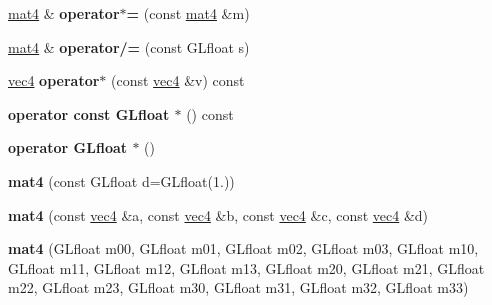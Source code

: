 \begin{DoxyCompactItemize}
\item 
\hypertarget{class_angel_1_1mat4_a9baa0a57a76f9bb9c678bc6dd493e37e}{\hyperlink{class_angel_1_1mat4}{mat4} \& {\bfseries operator$\ast$=} (const \hyperlink{class_angel_1_1mat4}{mat4} \&m)}\label{class_angel_1_1mat4_a9baa0a57a76f9bb9c678bc6dd493e37e}

\item 
\hypertarget{class_angel_1_1mat4_afe41b60ec27afc980d0f37625db898ae}{\hyperlink{class_angel_1_1mat4}{mat4} \& {\bfseries operator/=} (const \-G\-Lfloat s)}\label{class_angel_1_1mat4_afe41b60ec27afc980d0f37625db898ae}

\item 
\hypertarget{class_angel_1_1mat4_a820e0c317d1836cd224ff75f676c6f2f}{\hyperlink{struct_angel_1_1vec4}{vec4} {\bfseries operator$\ast$} (const \hyperlink{struct_angel_1_1vec4}{vec4} \&v) const }\label{class_angel_1_1mat4_a820e0c317d1836cd224ff75f676c6f2f}

\item 
\hypertarget{class_angel_1_1mat4_a93c2295529f8cde832378076837d202e}{{\bfseries operator const G\-Lfloat $\ast$} () const }\label{class_angel_1_1mat4_a93c2295529f8cde832378076837d202e}

\item 
\hypertarget{class_angel_1_1mat4_a83e8b31ac751f67e31985fc104e1a0e6}{{\bfseries operator G\-Lfloat $\ast$} ()}\label{class_angel_1_1mat4_a83e8b31ac751f67e31985fc104e1a0e6}

\item 
\hypertarget{class_angel_1_1mat4_ae4dcc751dab1439d187d31187527d7db}{{\bfseries mat4} (const \-G\-Lfloat d=\-G\-Lfloat(1.))}\label{class_angel_1_1mat4_ae4dcc751dab1439d187d31187527d7db}

\item 
\hypertarget{class_angel_1_1mat4_a751177e4ed4083c4935c18e20d99c394}{{\bfseries mat4} (const \hyperlink{struct_angel_1_1vec4}{vec4} \&a, const \hyperlink{struct_angel_1_1vec4}{vec4} \&b, const \hyperlink{struct_angel_1_1vec4}{vec4} \&c, const \hyperlink{struct_angel_1_1vec4}{vec4} \&d)}\label{class_angel_1_1mat4_a751177e4ed4083c4935c18e20d99c394}

\item 
\hypertarget{class_angel_1_1mat4_a4231505378561a211c9c98ef665ed2e4}{{\bfseries mat4} (\-G\-Lfloat m00, \-G\-Lfloat m01, \-G\-Lfloat m02, \-G\-Lfloat m03, \-G\-Lfloat m10, \-G\-Lfloat m11, \-G\-Lfloat m12, \-G\-Lfloat m13, \-G\-Lfloat m20, \-G\-Lfloat m21, \-G\-Lfloat m22, \-G\-Lfloat m23, \-G\-Lfloat m30, \-G\-Lfloat m31, \-G\-Lfloat m32, \-G\-Lfloat m33)}\label{class_angel_1_1mat4_a4231505378561a211c9c98ef665ed2e4}


\end{DoxyCompactItemize}
